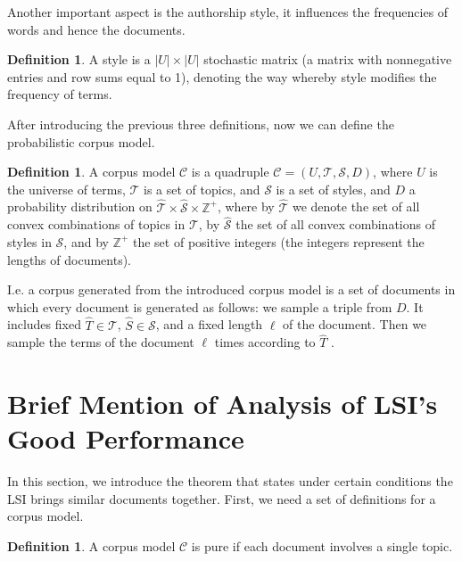 \documentclass[a4paper,11pt,DIV=15]{scrartcl} %
\theoremstyle{plain}
\theoremstyle{definition}
\newtheorem{definition}[theorem]{Definition}
\begin{document}
Another important aspect is the authorship style, it influences the frequencies of words and hence the documents. 
\begin{definition}
    A style is a $|U| \times|U|$ stochastic matrix (a matrix with nonnegative entries and row sums equal to 1), denoting the way whereby style modifies
the frequency of terms.
\end{definition}

After introducing the previous three definitions, now we can define the probabilistic corpus model.
\begin{definition}
     A corpus model $\mathscr{C}$ is a quadruple $\mathscr{C} = (U,\mathscr{T}, \mathscr{S}, D)$, where $U$ is
the universe of terms, $\mathscr{T}$ is a set of topics, and $\mathscr{S}$ is a set of styles, and $D$ a probability distribution on $\hat{\mathscr{T}} \times \hat{\mathscr{S}} \times \mathbb{Z}^+$, where by $\hat{\mathscr{T}}$ we denote the set of all convex combinations of topics in $\mathscr{T}$, by $\hat{\mathscr{S}}$ the set of all convex combinations of styles in $\mathscr{S}$, and by 
$\mathbb{Z}^+$ the set of positive integers (the integers represent the lengths of documents).
\end{definition}
I.e. a corpus generated from the introduced corpus model is a set of documents in which every document is generated as follows: we sample a triple from $D$. It includes fixed $\hat{T} \in \mathscr{T}$, $\hat{S} \in \mathscr{S}$, and a fixed length $\ell$ of the document. Then we sample the terms of the document $\ell$ times according to $\hat{T}$ \cite{APAPADIMITRIOU2000217}.


\section{Brief Mention of Analysis of LSI's Good Performance} \label{Brief Mention of Analysis of LSI's Good Performance} %
In this section, we introduce the theorem that states under certain conditions the LSI brings similar documents together.
First, we need a set of definitions for a corpus model.
\begin{definition}
  A corpus model $\mathscr{C}$ is pure if each document involves a single topic.
\end{definition}
\end{document}
